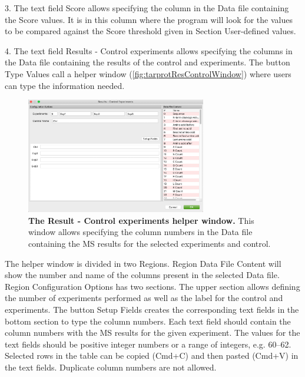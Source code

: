 \num{3}. The text field Score allows specifying the column in the Data file
containing the Score values. It is in this column where the program will look for
the values to be compared against the Score threshold given in Section User-defined
values.

\num{4}. \label{par:limprotResultControl}The text field Results - Control experiments
allows specifying the columns in the Data file containing the results of the
control and experiments. The button Type Values call a helper window
(\autoref{fig:tarprotResControlWindow}) where users can type the information needed. 

\begin{figure}[h]
    \centering
    \includegraphics[width=0.7\textwidth]{./IMAGES/MOD-TARPROT/tarprot-rescontrol.jpg}
    \caption[The Result - Control experiments helper window]{\textbf{The Result -
    Control experiments helper window.} This window allows specifying the column
    numbers in the Data file containing the MS results for the selected experiments
    and control.} 
    \label{fig:tarprotResControlWindow}
    \vspace{-5pt} 	
\end{figure}

The helper window is divided in two Regions. Region Data File Content will show the 
number and name of the columns present in the selected Data file. Region
Configuration Options has two sections. The upper section allows defining the number
of experiments performed as well as the label for the control and experiments. The
button Setup Fields creates the corresponding text fields in the bottom section to
type the column numbers. Each text field should contain the column numbers with the
MS results for the given experiment. The values for the text fields should be positive
integer numbers or a range of integers, e.g. \numrange[range-phrase=--]{60}{62}.
Selected rows in the table can be copied (Cmd+C) and then pasted (Cmd+V) in the text
fields. Duplicate column numbers are not allowed.

